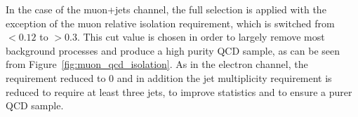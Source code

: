 
In the case of the muon+jets channel, the full selection is applied with the exception of the muon relative
isolation requirement, which is switched from $<0.12$ to $>0.3$. This cut value is chosen in order to
largely remove most background processes and produce a high purity QCD sample, as can be seen from
Figure~\ref{fig:muon_qcd_isolation}. As in the electron channel, the \btag requirement reduced to 0 \btags and
in addition the jet multiplicity requirement is reduced to require at least three jets, to improve statistics
and to ensure a purer QCD sample.

